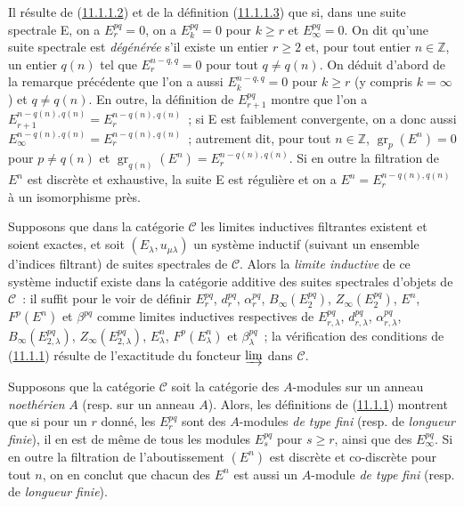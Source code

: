 \begin{env}[11.1.6]
\label{0.11.1.6-fr}
Il résulte de (\hyperref[0.11.1.1.2-fr]{11.1.1.2}) et de la définition
(\hyperref[0.11.1.1.3-fr]{11.1.1.3}) que si, dans une suite spectrale E, on a
$E_r^{pq}=0$, on a $E_k^{pq}=0$ pour $k\geq r$ et $E_\infty^{pq}=0$. On dit
qu'une suite spectrale est \emph{dégénérée} s'il existe un entier $r\geq2$ et,
pour tout entier $n\in\mathbb Z$, un entier $q(n)$ tel que
$E_r^{n-q,q}=0$ pour tout $q\ne q(n)$. On déduit d'abord de la remarque
précédente que l'on a aussi $E_k^{n-q,q}=0$ pour $k\geq r$ (y compris
$k=\infty$) et $q\ne q(n)$. En outre, la définition de $E_{r+1}^{pq}$ montre
que l'on a
$E_{r+1}^{n-q(n),q(n)}=E_r^{n-q(n),q(n)}$~; si E est faiblement convergente,
on a donc aussi
$E_\infty^{n-q(n),q(n)}=E_r^{n-q(n),q(n)}$~; autrement dit, pour tout
$n\in\mathbb Z$, $\operatorname{gr}_p(E^n)=0$ pour $p\ne q(n)$ et
$\operatorname{gr}_{q(n)}(E^n)=E_r^{n-q(n),q(n)}$. Si en outre la filtration
de $E^n$ est discrète et exhaustive, la suite E est régulière et on a
$E^n=E_r^{n-q(n),q(n)}$ à un isomorphisme près.
\end{env}

\begin{env}[11.1.7]
\label{0.11.1.7-fr}
Supposons que dans la catégorie $\mathcal C$ les limites inductives filtrantes
existent et soient exactes, et soit $(E_\lambda,u_{\mu\lambda})$ un système
inductif (suivant un ensemble d'indices filtrant) de suites spectrales de
$\mathcal C$. Alors la \emph{limite inductive} de ce système inductif existe
dans la catégorie additive des suites spectrales d'objets de $\mathcal C$~:
il suffit pour le voir de définir $E_r^{pq}$, $d_r^{pq}$, $\alpha_r^{pq}$,
$B_\infty(E_2^{pq})$, $Z_\infty(E_2^{pq})$, $E^n$, $F^p(E^n)$ et
$\beta^{pq}$ comme limites inductives respectives de $E_{r,\lambda}^{pq}$,
$d_{r,\lambda}^{pq}$, $\alpha_{r,\lambda}^{pq}$,
$B_\infty(E_{2,\lambda}^{pq})$, $Z_\infty(E_{2,\lambda}^{pq})$,
$E_\lambda^n$, $F^p(E_\lambda^n)$ et $\beta_\lambda^{pq}$~; la vérification
des conditions de (\hyperref[0.11.1.1-fr]{11.1.1}) résulte de l'exactitude du
foncteur $\varinjlim$ dans $\mathcal C$.
\end{env}

\begin{remark}[11.1.8]
\label{0.11.1.8-fr}
Supposons que la catégorie $\mathcal C$ soit la catégorie des $A$-modules sur
un anneau \emph{noethérien} $A$ (resp. sur un anneau $A$). Alors, les
définitions de (\hyperref[0.11.1.1-fr]{11.1.1}) montrent que si pour un $r$
donné, les $E_r^{pq}$ sont des $A$-modules \emph{de type fini} (resp. de
\emph{longueur finie}), il en est de même de tous les modules $E_s^{pq}$ pour
$s\geq r$, ainsi que des $E_\infty^{pq}$. Si en outre la filtration de
l'aboutissement $(E^n)$ est discrète et co-discrète pour tout $n$, on en
conclut que chacun des $E^n$ est aussi un $A$-module \emph{de type fini}
(resp. de \emph{longueur finie}).
\end{remark}

